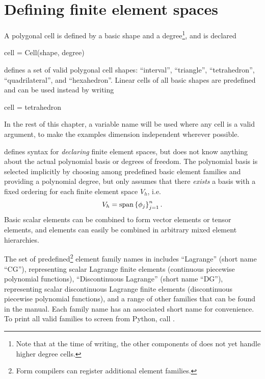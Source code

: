 \section{Defining finite element spaces} \label{ufl:sec:elements}
A polygonal cell is defined by a basic shape and a
degree\footnote{Note that at the time of writing, the other components
of \fenics{} does not yet handle higher degree cells.}, and is
declared
\begin{code}
cell = Cell(shape, degree)
\end{code}
\ufl{} defines a set of valid polygonal cell shapes:
``interval'', ``triangle'', ``tetrahedron'', ``quadrilateral'', and ``hexahedron''.
Linear cells of all basic shapes are predefined and can be used instead by writing
\begin{code}
cell = tetrahedron
\end{code}
In the rest of this chapter, a variable name  will be used
where any cell is a valid argument, to make the examples dimension
independent wherever possible.

\ufl{} defines syntax for \emph{declaring} finite element spaces,
but does not know anything about the actual polynomial basis or
degrees of freedom. The polynomial basis is selected implicitly by
choosing among predefined basic element families and providing a
polynomial degree, but
\ufl{} only assumes that there \emph{exists} a basis
with a fixed ordering for each finite element space $V_h$, i.e.
\begin{align}
V_h = \operatorname{span}\left\{ \phi_j \right\}_{j=1}^{n}.
\end{align}
Basic scalar elements can be combined to form vector elements or
tensor elements, and elements can easily be combined in arbitrary
mixed element hierarchies.

The set of predefined\footnote{Form compilers can register additional
element families.}  element family names in \ufl{} includes
``Lagrange'' (short name ``CG''), representing scalar Lagrange finite
elements (continuous piecewise polynomial functions), ``Discontinuous
Lagrange'' (short name ``DG''), representing scalar discontinuous
Lagrange finite elements (discontinuous piecewise polynomial
functions), and a range of other families that can be found in the
manual.  Each family name has an associated short name for
convenience.  To print all valid families to screen from Python, call
.

